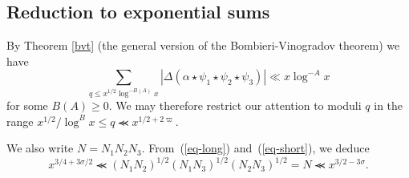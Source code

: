\documentclass[12pt,a4paper,reqno]{amsart}
\numberwithin{equation}{section}
\theoremstyle{plain}
\theoremstyle{definition}
\newcommand{\DIone}[2]{\mathcal{D}_{{#1}}({#2})}
\newcommand{\mods}[1]{\,(\mathrm{mod}\,{#1})}
\renewcommand{\sim}{\asymp}
\renewcommand{\lessapprox}{\llcurly}
\renewcommand{\gtrapprox}{\ggcurly}
\renewcommand{\phi}{\varphi}
\begin{document}
\subsection{Reduction to exponential sums}


By Theorem \ref{bvt} (the general version of the Bombieri-Vinogra\-dov
theorem) we have
$$
\sum_{q\leq x^{1/2}\log^{-B(A)} x}|\Delta(\alpha\star \psi_1\star
\psi_2\star \psi_3)|\ll x\log^{-A} x
$$
for some $B(A)\geq 0$. We may therefore restrict our attention to moduli $q$ in the range
$x^{1/2}/\log^Bx\leq q \lessapprox x^{1/2+2\varpi}$.
\par
We also write $N=N_1N_2N_3$. From~(\ref{eq-long})
and~(\ref{eq-short}), we deduce
\begin{equation}\label{eq-n}
  x^{3/4+3\sigma/2}\lessapprox
  (N_1N_2)^{1/2}(N_1N_3)^{1/2}(N_2N_3)^{1/2}=N\lessapprox x^{3/2-3\sigma}.
\end{equation}
\end{document}

